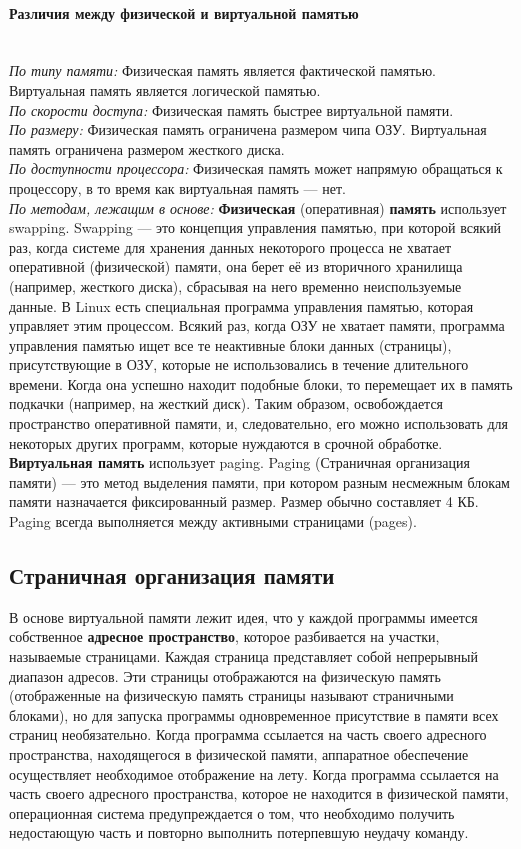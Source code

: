 \documentclass[12pt]{article}
\begin{document}
\paragraph*{Различия между физической и виртуальной памятью} ~\\
\emph{По типу памяти:}
Физическая память является фактической памятью.
Виртуальная память является логической памятью. \\
\emph{По скорости доступа:}
Физическая память быстрее виртуальной памяти. \\
\emph{По размеру:}
Физическая память ограничена размером чипа ОЗУ.
Виртуальная память ограничена размером жесткого диска. \\
\emph{По доступности процессора:}
Физическая память может напрямую обращаться к процессору, в то время как виртуальная память — нет. \\
\emph{По методам, лежащим в основе:}
\textbf{Физическая} (оперативная) \textbf{память} использует swapping. Swapping — это концепция управления памятью, при которой всякий раз, когда системе для хранения данных некоторого процесса не хватает оперативной (физической) памяти, она берет её из вторичного хранилища (например, жесткого диска), сбрасывая на него временно неиспользуемые данные. В Linux есть специальная программа управления памятью, которая управляет этим процессом. Всякий раз, когда ОЗУ не хватает памяти, программа управления памятью ищет все те неактивные блоки данных (страницы), присутствующие в ОЗУ, которые не использовались в течение длительного времени. Когда она успешно находит подобные блоки, то перемещает их в память подкачки (например, на жесткий диск). Таким образом, освобождается пространство оперативной памяти, и, следовательно, его можно использовать для некоторых других программ, которые нуждаются в срочной обработке.
\\\textbf{Виртуальная память} использует paging. Paging (Страничная организация памяти) — это метод выделения памяти, при котором разным несмежным блокам памяти назначается фиксированный размер. Размер обычно составляет 4 КБ. Paging всегда выполняется между активными страницами (pages).
\pagebreak

\subsection*{Страничная организация памяти}

В основе виртуальной памяти лежит идея, что у каждой программы имеется собственное \textbf{адресное пространство},
которое разбивается на участки, называемые страницами.
Каждая страница представляет собой непрерывный диапазон адресов.
Эти страницы отображаются на физическую память (отображенные на физическую память страницы называют страничными блоками), но для запуска программы
одновременное присутствие в памяти всех страниц необязательно.
Когда программа ссылается на часть своего адресного пространства, находящегося в физической памяти, 
аппаратное обеспечение осуществляет необходимое отображение на лету.
Когда программа ссылается на часть своего адресного пространства, которое не находится в физической памяти,
операционная система предупреждается о том, что необходимо получить недостающую часть
и повторно выполнить потерпевшую неудачу команду.
\end{document}
